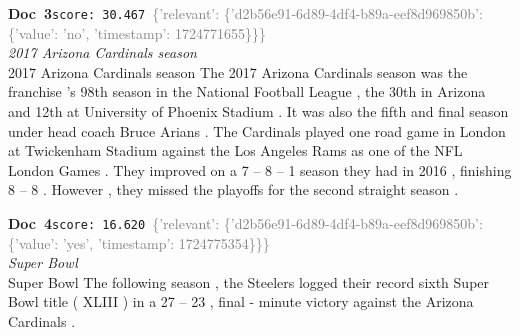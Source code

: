 \documentclass[a4paper,11pt]{article}
\begin{document}
\begin{docenv}
{\footnotesize\textcolor{doccolor}{\textbf{Doc~3}}}\hfill{\tiny\texttt{score:~30.467}}\ {\tiny\textcolor{gray}{\{'relevant': \{'d2b56e91-6d89-4df4-b89a-eef8d969850b': \{'value': 'no', 'timestamp': 1724771655\}\}\}}}\\[3pt]
{\small\textit{2017 Arizona Cardinals season}}\\[2pt]
\vspace{2pt}
{\footnotesize 2017 Arizona Cardinals season
The 2017 Arizona Cardinals season was the franchise 's 98th season in the National Football League , the 30th in Arizona and 12th at University of Phoenix Stadium . It was also the fifth and final season under head coach Bruce Arians . The Cardinals played one road game in London at Twickenham Stadium against the Los Angeles Rams as one of the NFL London Games . They improved on a 7 -- 8 -- 1 season they had in 2016 , finishing 8 -- 8 . However , they missed the playoffs for the second straight season .}
\end{docenv}
\begin{docenv}
{\footnotesize\textcolor{doccolor}{\textbf{Doc~4}}}\hfill{\tiny\texttt{score:~16.620}}\ {\tiny\textcolor{gray}{\{'relevant': \{'d2b56e91-6d89-4df4-b89a-eef8d969850b': \{'value': 'yes', 'timestamp': 1724775354\}\}\}}}\\[3pt]
{\small\textit{Super Bowl}}\\[2pt]
\vspace{2pt}
{\footnotesize Super Bowl
The following season , the Steelers logged their record sixth Super Bowl title ( XLIII ) in a 27 -- 23 , final - minute victory against the Arizona Cardinals .}
\end{docenv}
\end{document}
